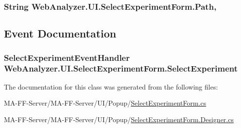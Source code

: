 \subsubsection[{Path}]{\setlength{\rightskip}{0pt plus 5cm}String Web\+Analyzer.\+U\+I.\+Select\+Experiment\+Form.\+Path\hspace{0.3cm}{\ttfamily [get]}, {\ttfamily [set]}}\label{class_web_analyzer_1_1_u_i_1_1_select_experiment_form_ad5b8d4def72474dd55f8d244955bae36}


\subsection{Event Documentation}
\hypertarget{class_web_analyzer_1_1_u_i_1_1_select_experiment_form_a1e364e5b7061777bab04e7b255eff656}{}
\subsubsection[{Select\+Experiment}]{\setlength{\rightskip}{0pt plus 5cm}Select\+Experiment\+Event\+Handler Web\+Analyzer.\+U\+I.\+Select\+Experiment\+Form.\+Select\+Experiment}\label{class_web_analyzer_1_1_u_i_1_1_select_experiment_form_a1e364e5b7061777bab04e7b255eff656}


The documentation for this class was generated from the following files\+:\begin{DoxyCompactItemize}
\item 
M\+A-\/\+F\+F-\/\+Server/\+M\+A-\/\+F\+F-\/\+Server/\+U\+I/\+Popup/\hyperlink{_select_experiment_form_8cs}{Select\+Experiment\+Form.\+cs}\item 
M\+A-\/\+F\+F-\/\+Server/\+M\+A-\/\+F\+F-\/\+Server/\+U\+I/\+Popup/\hyperlink{_select_experiment_form_8_designer_8cs}{Select\+Experiment\+Form.\+Designer.\+cs}\end{DoxyCompactItemize}

